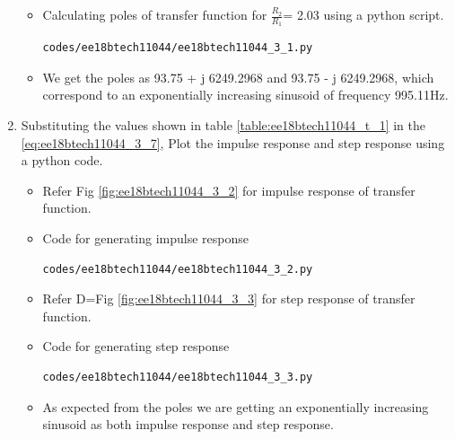 \begin{enumerate}[label=\arabic*.,ref=\theenumi]
\solution

\begin{itemize}
\item Calculating poles of transfer function for $\frac{R_2}{R_1}$= 2.03 using a python script.
\begin{lstlisting}
codes/ee18btech11044/ee18btech11044_3_1.py
\end{lstlisting}
\item We get the poles as 93.75 + j 6249.2968 and 93.75 - j 6249.2968, which correspond to an exponentially increasing sinusoid of  frequency  995.11Hz. 
\end{itemize}


\item Substituting the values shown in table \ref{table:ee18btech11044_t_1} in the   \eqref{eq:ee18btech11044_3_7}, Plot the impulse response and step response using a python code.

\solution

\begin{itemize}
\item Refer Fig \ref{fig:ee18btech11044_3_2} for impulse response of transfer function.
\item Code for generating impulse response
\begin{lstlisting}
codes/ee18btech11044/ee18btech11044_3_2.py
\end{lstlisting}
\item Refer D=Fig \ref{fig:ee18btech11044_3_3} for step response of transfer function.
\item Code for generating step response
\begin{lstlisting}
codes/ee18btech11044/ee18btech11044_3_3.py
\end{lstlisting}
\item As expected from the poles we are getting an exponentially increasing sinusoid as both impulse response and step response.
\end{itemize}


\end{enumerate}
